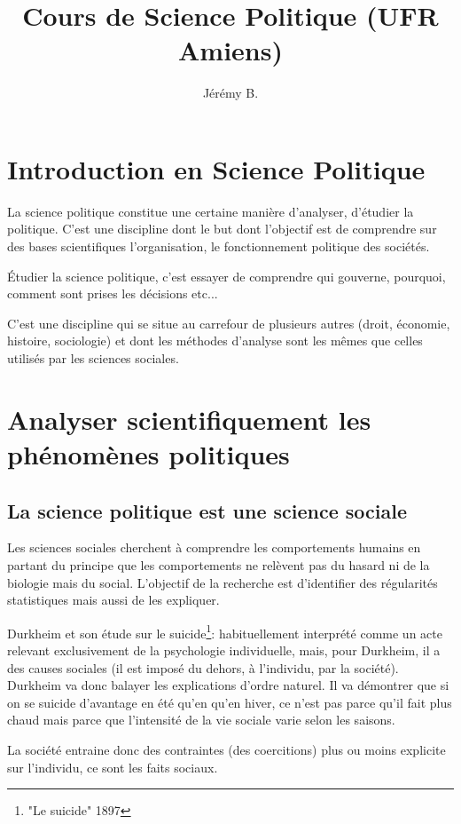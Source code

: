 \documentclass[12pt, a4paper, openany]{book}
\author{Jérémy B.}
\date{}
\title{Cours de Science Politique (UFR Amiens)}
\begin{document}
\maketitle

\chapter{Introduction en Science Politique}

La science politique constitue une certaine manière d'analyser, d'étudier la politique. C'est une discipline dont le but dont l'objectif est de comprendre sur des bases scientifiques l'organisation, le fonctionnement politique des sociétés.

Étudier la science politique, c'est essayer de comprendre qui gouverne, pourquoi, comment sont prises les décisions etc...

C'est une discipline qui se situe au carrefour de plusieurs autres (droit, économie, histoire, sociologie) et dont les méthodes d'analyse sont les mêmes que celles utilisés par les sciences sociales.

\chapter{Analyser scientifiquement les phénomènes politiques}

	\section{La science politique est une science sociale}

Les sciences sociales cherchent à comprendre les comportements humains en partant du principe que les comportements ne relèvent pas du hasard ni de la biologie mais du social. L'objectif de la recherche est d'identifier des régularités statistiques mais aussi de les expliquer.

Durkheim et son étude sur le suicide\footnote{"Le suicide" 1897}: habituellement interprété comme un acte relevant exclusivement de la psychologie individuelle, mais, pour Durkheim, il a des causes sociales (il est imposé du dehors, à l'individu, par la société). Durkheim va donc balayer les explications d'ordre naturel. Il va démontrer que si on se suicide d'avantage en été qu'en qu'en hiver, ce n'est pas parce qu'il fait plus chaud mais parce que l'intensité de la vie sociale varie selon les saisons.

La société entraine donc des contraintes (des coercitions) plus ou moins explicite sur l'individu, ce sont les faits sociaux.
\end{document}
